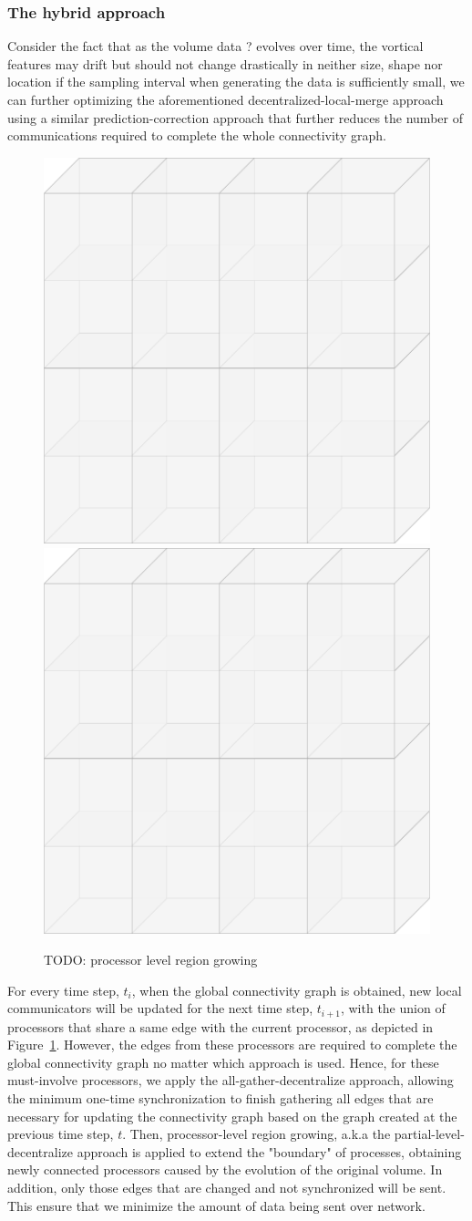 \documentclass[10pt, conference, compsocconf]{IEEEtran}
\begin{document}
\subsubsection{The hybrid approach}

Consider the fact that as the {volume data ?} evolves over time, the vortical features may drift but should not change drastically in neither size, shape nor location if the sampling interval when generating the data is sufficiently small, we can further optimizing the aforementioned decentralized-local-merge approach using a similar prediction-correction approach that further reduces the number of communications required to complete the whole connectivity graph.

\begin{figure}[ht]
	\centering
	\includegraphics[width=0.45\linewidth]{grid2d.png}
	\includegraphics[width=0.45\linewidth]{grid2d.png}
	\caption{TODO: processor level region growing}
	\label{fig:hybrid}
\end{figure}

For every time step, $t_i$, when the global connectivity graph is obtained, new local communicators will be updated for the next time step, $t_{i+1}$, with the union of processors that share a same edge with the current processor, as depicted in Figure~\ref{fig:hybrid}. However, the edges from these processors are required to complete the global connectivity graph no matter which approach is used. Hence, for these must-involve processors, we apply the all-gather-decentralize approach, allowing the minimum one-time synchronization to finish gathering all edges that are necessary for updating the connectivity graph based on the graph created at the previous time step, $t$. Then, processor-level region growing, a.k.a the partial-level-decentralize approach is applied to extend the "boundary" of processes, obtaining newly connected processors caused by the evolution of the original volume. In addition, only those edges that are changed and not synchronized will be sent. This ensure that we minimize the amount of data being sent over network.
\end{document}
